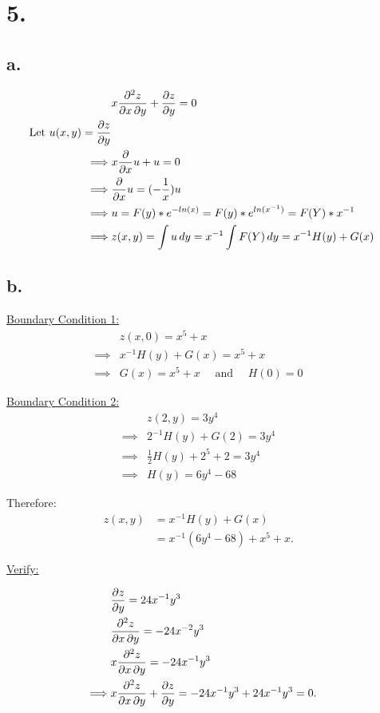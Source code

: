 \documentclass{article}
\begin{document}
\section*{5.}
\subsection*{a.}
\begin{align*}
  &x \pdv{z}{x,y} + \pdv{z}{y} = 0 &&\\
  \text{Let } u(x,y) = \pdv{z}{y} &&\\
  \implies& x\pdv*{u}{x} + u = 0 &&\\
  \implies& \pdv*{u}{x} = (- \frac{1}{x}) u &&\\
  \implies& u = F(y) * e^{-ln(x)} = F(y) * e^{ln(x^{-1})} = F(Y) * x^{-1} &&\\
  \implies& z(x,y) 
  = \int u \,dy 
  = x^{-1} \int F(Y) \,dy = x^{-1}H(y) + G(x)
\end{align*}

\subsection*{b.}
\underline{Boundary Condition 1:}
\begin{align*}
  &z(x,0) = x^5 + x &&\\
  \implies& x^{-1} H(y) + G(x) = x^5 + x &&\\
  \implies& G(x)= x^5 + x \quad \text{ and } \quad H(0) = 0
\end{align*}

\underline{Boundary Condition 2:}
\begin{align*}
  &z(2, y) = 3y^4 &&\\
  \implies& 2^{-1}H(y) + G(2) = 3y^4 &&\\
  \implies& \frac{1}{2} H(y) + 2^5 + 2 = 3y^4 &&\\
  \implies& H(y) = 6y^4 -68
\end{align*}

Therefore:
\begin{align*}
  z(x,y) &= x^{-1} H(y) + G(x) &&\\
  &= x^{-1} (6y^4 -68) + x^5 + x.
\end{align*}

\underline{Verify:}

\begin{align*}
  &\pdv{z}{y} = 24x^{-1}y^3 &&\\
  &\pdv{z}{x,y} = -24x^{-2}y^3 &&\\
  &x \pdv{z}{x,y} = -24x^{-1}y^3 &&\\
  \implies& x \pdv{z}{x,y} + \pdv{z}{y} = -24x^{-1}y^3 + 24x^{-1}y^3 = 0.
\end{align*}
\end{document}
